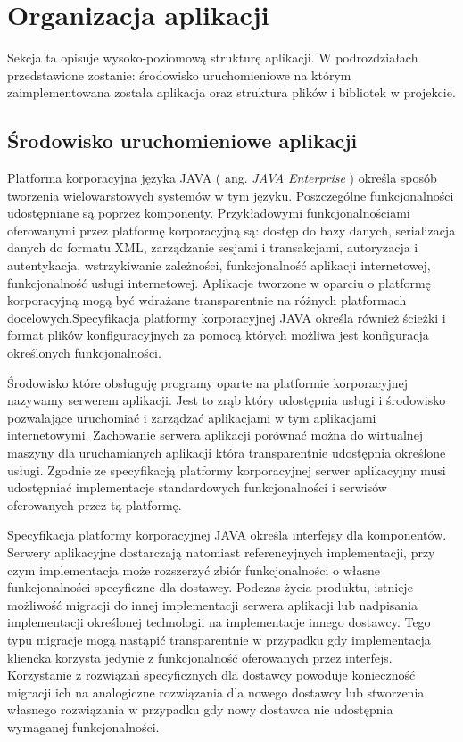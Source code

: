 \section{Organizacja aplikacji}
Sekcja ta opisuje wysoko-poziomową strukturę aplikacji. W podrozdziałach przedstawione zostanie: środowisko uruchomieniowe na którym zaimplementowana została aplikacja oraz struktura plików i bibliotek w projekcie.
\subsection{Środowisko uruchomieniowe aplikacji}
Platforma korporacyjna języka JAVA ( ang. \textit{JAVA Enterprise} ) określa sposób tworzenia wielowarstowych systemów w tym języku. Poszczególne funkcjonalności udostępniane są poprzez komponenty.  Przykładowymi funkcjonalnościami oferowanymi przez platformę korporacyjną są: dostęp do bazy danych, serializacja danych do formatu XML, zarządzanie sesjami i transakcjami, autoryzacja i autentykacja, wstrzykiwanie zależności, funkcjonalność aplikacji internetowej, funkcjonalność usługi internetowej. Aplikacje tworzone w oparciu o platformę korporacyjną mogą być wdrażane transparentnie na różnych platformach docelowych.Specyfikacja platformy korporacyjnej JAVA określa również ścieżki i format plików konfiguracyjnych za pomocą których możliwa jest konfiguracja określonych funkcjonalności.

Środowisko które obsługuję programy oparte na platformie korporacyjnej nazywamy serwerem aplikacji. Jest to zrąb który udostępnia usługi i środowisko pozwalające uruchomiać i zarządzać aplikacjami w tym aplikacjami internetowymi. Zachowanie serwera aplikacji porównać można do wirtualnej maszyny dla uruchamianych aplikacji która transparentnie udostępnia określone usługi. Zgodnie ze specyfikacją platformy korporacyjnej serwer aplikacyjny musi udostępniać implementacje standardowych funkcjonalności i serwisów oferowanych przez tą platformę. 

Specyfikacja platformy korporacyjnej JAVA określa interfejsy dla komponentów. Serwery aplikacyjne dostarczają natomiast referencyjnych implementacji, przy czym implementacja może rozszerzyć zbiór funkcjonalności o własne funkcjonalności specyficzne dla dostawcy. Podczas życia produktu, istnieje możliwość migracji do innej implementacji serwera aplikacji lub nadpisania implementacji określonej technologii na implementacje innego dostawcy. Tego typu migracje mogą nastąpić transparentnie w przypadku gdy implementacja kliencka korzysta jedynie z funkcjonalność oferowanych przez interfejs. Korzystanie z rozwiązań specyficznych dla dostawcy powoduje konieczność migracji ich na analogiczne rozwiązania dla nowego dostawcy lub stworzenia własnego rozwiązania w przypadku gdy nowy dostawca nie udostępnia wymaganej funkcjonalności.

